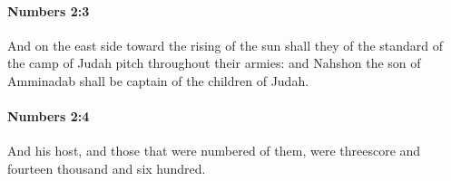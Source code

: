 		\paragraph{Numbers 2:3} %
			\label{NUMBERS-2-3}

			And on the east side toward the rising of the sun shall they of the standard of the camp of Judah pitch throughout their armies: and Nahshon the son of Amminadab shall be captain of the children of Judah.


		\paragraph{Numbers 2:4} %
			\label{NUMBERS-2-4}

			And his host, and those that were numbered of them, were threescore and fourteen thousand and six hundred.



